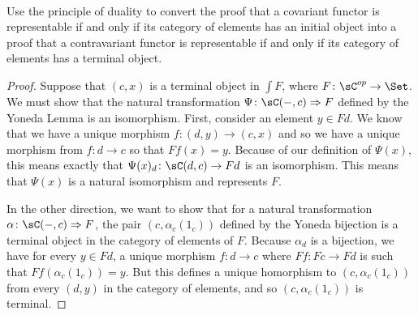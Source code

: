 \documentclass[../../main]{subfiles}
\begin{document}
\paragraph{}
\begin{exercise}
Use the principle of duality to convert the proof that a covariant functor is
representable if and only if its category of elements has an initial object
into a proof that a contravariant functor is representable if and only if its
category of elements has a terminal object.
\end{exercise}
\begin{proof}
Suppose that $(c,x)$ is a terminal object in $\int F$, where $F\colon \sC^{op}
\rightarrow \Set$. We must show that the natural transformation $\Psi\colon \sC(-,c)
\Rightarrow F$ defined by the Yoneda Lemma is an isomorphism. First, consider
an element $y \in Fd$. We know that we have a unique morphism $f\colon (d,y)
\rightarrow (c,x)$ and so we have a unique morphism from $f\colon d \rightarrow c$
so that $Ff(x) = y$.  Because of our definition of $\Psi(x)$, this means
exactly that $\Psi(x)_d\colon \sC(d,c) \rightarrow Fd$ is an isomorphism. This means
that $\Psi(x)$ is a natural isomorphism and represents $F$.

In the other direction, we want to show that for a natural transformation
$\alpha\colon \sC(-,c) \Rightarrow F$, the pair $(c,\alpha_c(1_c))$ defined by the
Yoneda bijection is a terminal object in the category of elements of $F$.
Because $\alpha_d$ is a bijection, we have for every $y \in Fd$, a unique
morphism $f\colon d \rightarrow c$ where $Ff\colon Fc \rightarrow Fd$ is such that
$Ff(\alpha_c(1_c)) = y$. But this defines a unique homorphism to $(c,
\alpha_c(1_c))$ from every $(d,y)$ in the category of elements, and so $(c,
\alpha_c(1_c))$ is terminal.
\end{proof}
\end{document}
